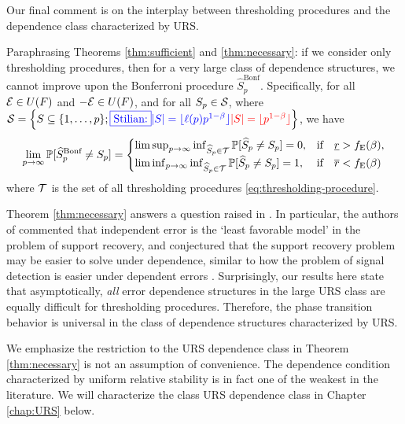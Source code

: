Our final comment is on the interplay between thresholding procedures and the dependence class characterized by URS.
\begin{remark} \label{rmk:dependence-assumptions}
Paraphrasing Theorems \ref{thm:sufficient} and \ref{thm:necessary}: if we consider only thresholding procedures, then for a very large class of dependence structures, we cannot improve upon the Bonferroni procedure $\widehat{S}_p^{\text{Bonf}}$. 
Specifically, for all ${\cal E}\in U(F)$ and ${-\cal E}\in U(F)$, and for all $S_p\in {\cal S}$, where 
$\mathcal{S} = \left\{S\subseteq\{1,\ldots,p\};\stilian{|S| = \lfloor \ell (p) p^{1-\beta}\rfloor}{|S|=\lfloor p^{1-\beta}\rfloor}\right\}$, we have
\begin{equation}
    \lim_{p\to\infty} \P[\widehat{S}_p^{\text{Bonf}}\neq S_p]
    = \begin{cases}
    \limsup_{p\to\infty} \inf_{\widehat{S}_p \in {\cal T}} \P[\widehat{S}_p\neq S_p] = 0, & \text{if}\quad \underline{r} > f_{\mathrm{E}}(\beta),\\
    \liminf_{p\to\infty} \inf_{\widehat{S}_p \in {\cal T}} \P[\widehat{S}_p\neq S_p] = 1, & \text{if}\quad \overline{r} < f_{\mathrm{E}}(\beta)\\
    \end{cases}
\end{equation}
where $\cal T$ is the set of all thresholding procedures \eqref{eq:thresholding-procedure}. 

Theorem \ref{thm:necessary} answers a question raised in \citet{butucea2018variable}.
In particular, the authors of \citep{butucea2018variable} commented that independent error is the  `least favorable model' in the problem of support recovery, and 
conjectured that the support recovery problem may be easier to solve under dependence, similar to how the problem of signal detection is easier under dependent 
errors \citep{hall2010innovated}. 
Surprisingly, our results here state that asymptotically, \emph{all} error dependence structures in the large URS class are equally difficult for {thresholding procedures}. Therefore, the phase transition behavior is universal in the class of dependence structures characterized by URS.
\end{remark}

We emphasize the restriction to the URS dependence class in Theorem \ref{thm:necessary} is {not} an assumption of convenience. 
The dependence condition characterized by uniform relative stability is in fact one of the weakest in the literature.
We will characterize the class URS dependence class in Chapter \ref{chap:URS} below.

